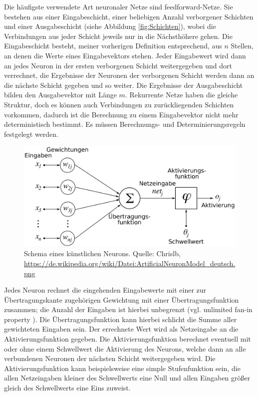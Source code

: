 \documentclass[
	12pt,
	a4paper,
	BCOR10mm,
	DIV14,
	listof=totoc,
	bibliography=totoc,
	headsepline
]{scrreprt}
\begin{document}
Die häufigste verwendete Art neuronaler Netze sind feedforward-Netze. Sie bestehen aus einer Eingabeschicht, einer beliebigen Anzahl verborgener Schichten und einer Ausgabeschicht (siehe Abbildung \ref{fig:Schichten}), wobei die Verbindungen aus jeder Schicht jeweils nur in die Nächsthöhere gehen. 
Die Eingabeschicht besteht, meiner vorherigen Definition entsprechend, aus $n$ Stellen, an denen die Werte eines Eingabevektors stehen. Jeder Eingabewert wird dann an jedes Neuron in der ersten verborgenen Schicht weitergegeben und dort verrechnet, die Ergebnisse der Neuronen der verborgenen Schicht werden dann an die nächste Schicht gegeben und so weiter.
Die Ergebnisse der Ausgabeschicht bilden den Ausgabevektor mit Länge $m$.
Rekurrente Netze haben die gleiche Struktur, doch es können auch Verbindungen zu zurückliegenden Schichten vorkommen, dadurch ist die Berechnung zu einem Eingabevektor nicht mehr deterministisch bestimmt. Es müssen Berechnungs- und Determinierungsregeln festgelegt werden. 

\begin{figure}[h]
	\begin{center}
		\includegraphics[totalheight=0.2\textheight]{Bilder/ArtificialNeuronModel_deutsch.png}
	\end{center}
	\caption{Schema eines künstlichen Neurons. Quelle: Chrislb, \url{https://de.wikipedia.org/wiki/Datei:ArtificialNeuronModel_deutsch.png}} %
	\label{fig:Neuron}
\end{figure}

Jedes Neuron rechnet die eingehenden Eingabewerte mit einer zur Übertragungskante zugehörigen Gewichtung mit einer Übertragungsfunktion zusammen; die Anzahl der Eingaben ist hierbei unbegrenzt (vgl. \glqq unlimited fan-in property\grqq{} \cite{Rojas:1996:NNS:235222}). Die Übertragungsfunktion kann hierbei schlicht die Summe aller gewichteten Eingaben sein. Der errechnete Wert wird als Netzeingabe an die Aktivierungsfunktion gegeben. 
Die Aktivierungsfunktion berechnet eventuell mit oder ohne einem Schwellwert die Aktivierung des Neurons, welche dann an alle verbundenen Neuronen der nächsten Schicht weitergegeben wird.
Die Aktivierungsfunktion kann beispielsweise eine simple Stufenfunktion sein, die allen Netzeingaben kleiner des Schwellwerts eine Null und allen Eingaben größer gleich des Schwellwerts eine Eins zuweist.
\end{document}
